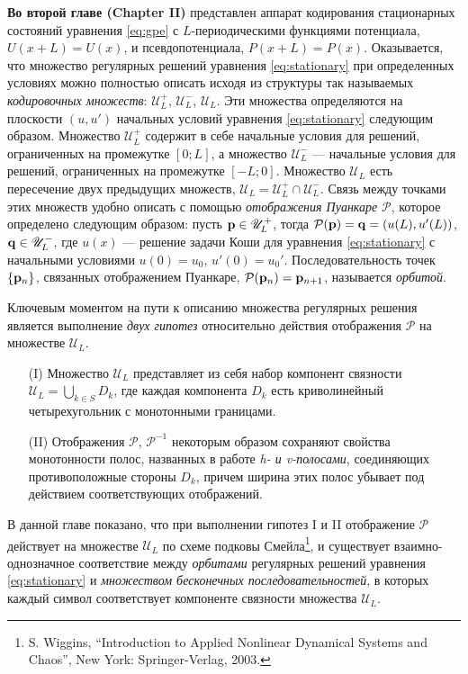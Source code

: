 \documentclass[candidate, href, colorlinks]{disser}
\begin{document}
\textbf{Во второй главе (Chapter II)} представлен аппарат кодирования стационарных состояний уравнения \eqref{eq:gpe} с $L$-периодическими функциями потенциала, $U(x + L) = U(x)$, и псевдопотенциала, $P(x + L) = P(x)$.
Оказывается, что множество регулярных решений уравнения \eqref{eq:stationary} при определенных условиях можно полностью описать исходя из структуры так называемых {\it кодировочных множеств}: $\mathscr{U}_L^+$, $\mathscr{U}_L^-$, $\mathscr{U}_L$.
Эти множества определяются на плоскости $(u, u')$ начальных условий уравнения \eqref{eq:stationary} следующим образом.
Множество $\mathscr{U}_L^+$ содержит в себе начальные условия для решений, ограниченных на промежутке $[0; L]$, а множество $\mathscr{U}_L^-$ --- начальные условия для решений, ограниченных на промежутке $[-L; 0]$.
Множество $\mathscr{U}_L$ есть пересечение двух предыдущих множеств, $\mathscr{U}_L = \mathscr{U}_L^+ \cap \mathscr{U}_L^-$.
Связь между точками этих множеств удобно описать с помощью {\it отображения Пуанкаре} $\mathcal{P}$, которое определено следующим образом: пусть $\vb{p} \in \mathscr{U}_L^+$, тогда $\mathcal{P} (\vb{p}) = \vb{q} = (u(L), u'(L))$, $\vb{q} \in \mathscr{U}_L^-$, где $u(x)$ --- решение задачи Коши для уравнения \eqref{eq:stationary} с начальными условиями $u(0) = u_0$, $u'(0) = u_0'$.
Последовательность точек $\{ \vb{p}_n \}$, связанных отображением Пуанкаре, $\mathcal{P}(\vb{p}_n) = \vb{p}_{n + 1}$, называется {\it орбитой}.

Ключевым моментом на пути к описанию множества регулярных решения является выполнение {\it двух гипотез} относительно действия отображения $\mathcal{P}$ на множестве $\mathscr{U}_L$.
\begin{itemize}
	\item[(I)] Множество $\mathscr{U}_L$ представляет из себя набор компонент связности $\mathscr{U}_L = \bigcup_{k \in S} D_k$, где каждая компонента $D_k$ есть криволинейный четырехугольник с монотонными границами.
	\item[(II)] Отображения $\mathcal{P}$, $\mathcal{P}^{-1}$ некоторым образом сохраняют свойства монотонности полос, названных в работе {\it h- и v-полосами}, соединяющих противоположные стороны $D_k$, причем ширина этих полос убывает под действием соответствующих отображений.
\end{itemize}
В данной главе показано, что при выполнении гипотез I и II отображение $\mathcal{P}$ действует на множестве $\mathscr{U}_L$ по схеме подковы Смейла\footnote{S. Wiggins, ``Introduction to Applied Nonlinear Dynamical Systems and Chaos'', New York: Springer-Verlag, 2003.}, и существует взаимно-однозначное соответствие между {\it орбитами} регулярных решений уравнения \eqref{eq:stationary} и {\it множеством бесконечных последовательностей}, в которых каждый символ соответствует компоненте связности множества $\mathscr{U}_L$.
\end{document}
